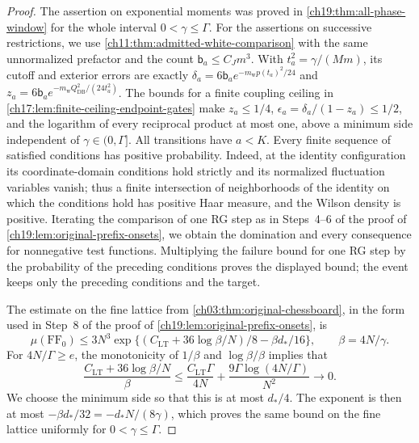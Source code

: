 \begin{proof}
The assertion on exponential moments was proved in \cref{ch19:thm:all-phase-window} for the whole interval $0<\gamma\le\Gamma$. For the assertions on successive restrictions, we use \cref{ch11:thm:admitted-white-comparison} with the same unnormalized prefactor and the count $\mathsf b_a\le C_Jm^3$. With $t_a^2=\gamma/(Mm)$, its cutoff and exterior errors are exactly $\delta_a=6\mathsf b_ae^{-m_{\mathrm w}p(t_a)^2/24}$ and $z_a=6\mathsf b_ae^{-m_{\mathrm w}Q_{\mathrm{DB}}^2/(24t_a^2)}$. The bounds for a finite coupling ceiling in \cref{ch17:lem:finite-ceiling-endpoint-gates} make $z_a\le1/4$, $\epsilon_a=\delta_a/(1-z_a)\le1/2$, and the logarithm of every reciprocal product at most one, above a minimum side independent of $\gamma\in(0,\Gamma]$. All transitions have $a<K$. Every finite sequence of satisfied conditions has positive probability. Indeed, at the identity configuration its coordinate-domain conditions hold strictly and its normalized fluctuation variables vanish; thus a finite intersection of neighborhoods of the identity on which the conditions hold has positive Haar measure, and the Wilson density is positive. Iterating the comparison of one RG step as in Steps~4--6 of the proof of \cref{ch19:lem:original-prefix-onsets}, we obtain the domination and every consequence for nonnegative test functions. Multiplying the failure bound for one RG step by the probability of the preceding conditions proves the displayed bound; the event keeps only the preceding conditions and the target.

The estimate on the fine lattice from \cref{ch03:thm:original-chessboard}, in the form used in Step~8 of the proof of \cref{ch19:lem:original-prefix-onsets}, is
\[
 \mu(\mathrm{FF}_0)\le3N^3\exp\bigl\{(C_{\mathrm{LT}}+36\log\beta/N)/8-\beta d_*/16\bigr\},\qquad\beta=4N/\gamma.
\]
For $4N/\Gamma\ge e$, the monotonicity of $1/\beta$ and $\log\beta/\beta$ implies that
\[
 \frac{C_{\mathrm{LT}}+36\log\beta/N}{\beta}\le\frac{C_{\mathrm{LT}}\Gamma}{4N}+\frac{9\Gamma\log(4N/\Gamma)}{N^2}\longrightarrow0.
\]
We choose the minimum side so that this is at most $d_*/4$. The exponent is then at most $-\beta d_*/32=-d_*N/(8\gamma)$, which proves the same bound on the fine lattice uniformly for $0<\gamma\le\Gamma$.
\end{proof}
